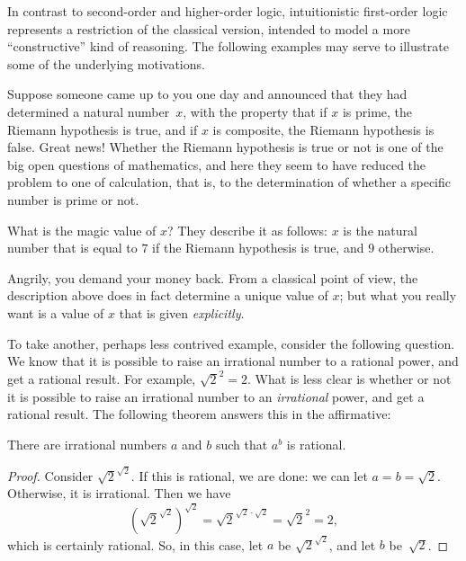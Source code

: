 \documentclass[../../../include/open-logic-section]{subfiles}
\begin{document}


In contrast to second-order and higher-order logic, intuitionistic
first-order logic represents a restriction of the classical version,
intended to model a more ``constructive'' kind of reasoning. The
following examples may serve to illustrate some of the underlying
motivations.

Suppose someone came up to you one day and announced that they had
determined a natural number~$x$, with the property that if $x$ is
prime, the Riemann hypothesis is true, and if $x$ is composite, the
Riemann hypothesis is false. Great news!{} Whether the Riemann
hypothesis is true or not is one of the big open questions of
mathematics, and here they seem to have reduced the problem to one of
calculation, that is, to the determination of whether a specific
number is prime or not.

What is the magic value of $x$? They describe it as follows: $x$ is
the natural number that is equal to $7$ if the Riemann hypothesis is
true, and $9$ otherwise.

Angrily, you demand your money back. From a classical point of view,
the description above does in fact determine a unique value of $x$;
but what you really want is a value of $x$ that is given
\emph{explicitly}.

To take another, perhaps less contrived example, consider the
following question. We know that it is possible to raise an irrational
number to a rational power, and get a rational result. For example,
$\sqrt{2}^2 = 2$. What is less clear is whether or not it is possible
to raise an irrational number to an \emph{irrational} power, and get a
rational result. The following theorem answers this in the
affirmative:

\begin{thm}
There are irrational numbers $a$ and $b$ such that $a^b$ is rational.
\end{thm}

\begin{proof}
Consider $\sqrt{2}^{\sqrt{2}}$. If this is rational, we are done:
we can let $a = b = \sqrt{2}$. Otherwise, it is irrational. Then we
have
\[
(\sqrt{2}^{\sqrt{2}})^{\sqrt{2}} = \sqrt{2}^{\sqrt{2} \cdot
  \sqrt{2}} = \sqrt{2}^2 = 2,
\]
which is certainly rational. So, in this case, let $a$ be
$\sqrt{2}^{\sqrt{2}}$, and let $b$ be~$\sqrt 2$.
\end{proof}
\end{document}
